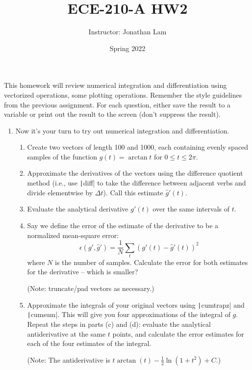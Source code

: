 \documentclass{article}
\title{ECE-210-A HW2}
\author{Instructor: Jonathan Lam}
\date{Spring 2022}
\begin{document}
\maketitle

\noindent This homework will review numerical integration and differentiation using vectorized operations, some plotting operations. Remember the style guidelines from the previous assignment. For each question, either save the result to a variable or print out the result to the screen (don't suppress the result).

\begin{enumerate}
\item
  Now it's your turn to try out numerical integration and differentiation.
  \begin{enumerate}
  \item Create two vectors of length 100 and 1000, each containing evenly spaced samples of the function $g(t)=\arctan t$ for $0\le t\le 2\pi$.
    
  \item Approximate the derivatives of the vectors using the difference quotient method (i.e., use \texttt|diff| to take the difference between adjacent verbs and divide elementwise by $\Delta t$). Call this estimate $\hat{g}'(t)$.
    
  \item Evaluate the analytical derivative $g'(t)$ over the same intervals of $t$.
    
  \item Say we define the error of the estimate of the derivative to be a normalized mean-square error:
    \begin{equation*}
      \epsilon(g',\hat{g}')=\frac{1}{N}\sum_{t} (g'(t)-\hat{g}'(t))^2
    \end{equation*}
    where $N$ is the number of samples. Calculate the error for both estimates for the derivative -- which is smaller?

    (Note: truncate/pad vectors as necessary.)
    
  \item Approximate the integrals of your original vectors using \texttt|cumtrapz| and \texttt|cumsum|. This will give you four approximations of the integral of $g$. Repeat the steps in parts (c) and (d): evaluate the analytical antiderivative at the same $t$ points, and calculate the error estimates for each of the four estimates of the integral.

    (Note: The antiderivative is $t \arctan\left(t\right)-\frac{1}{2}\ln\left(1+t^{2}\right)+C$.)
    

\end{enumerate}
\end{enumerate}
\end{document}
